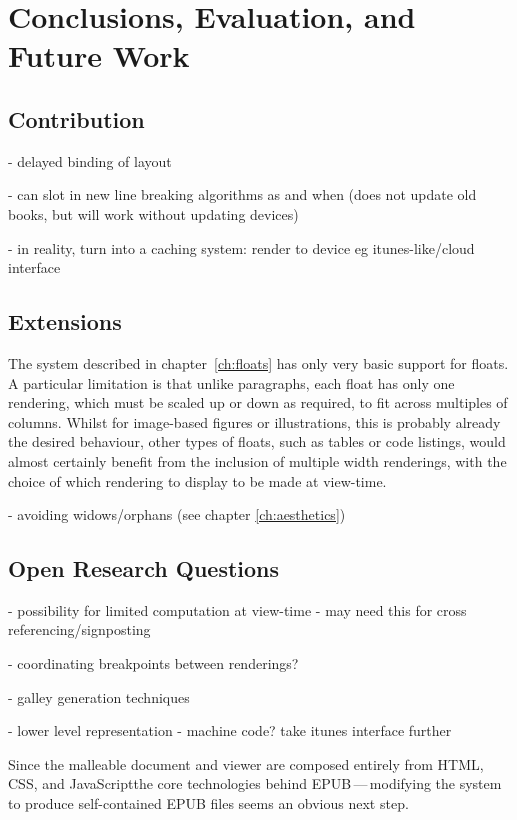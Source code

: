 \chapter{Conclusions, Evaluation, and Future Work}\label{ch:conclusions}

\section{Contribution}

- delayed binding of layout

- can slot in new line breaking algorithms as and when (does not update old books, but will work without updating devices)

- in reality, turn into a caching system: render to device eg itunes-like/cloud interface


\section{Extensions}
The system described in chapter~\ref{ch:floats} has only very basic support for floats. A particular limitation is that unlike paragraphs, each float has only one rendering, which must be scaled up or down as required, to fit across multiples of columns. Whilst for image-based figures or illustrations, this is probably already the desired behaviour, other types of floats, such as tables or code listings, would almost certainly benefit from the inclusion of multiple width renderings, with the choice of which rendering to display to be made at view-time. %

- avoiding widows/orphans (see chapter \ref{ch:aesthetics})



\section{Open Research Questions}

- possibility for limited computation at view-time - may need this for cross referencing/signposting \cite{Thimbleby2011}

- coordinating breakpoints between renderings?

- galley generation techniques

- lower level representation \cite{Bagley2010} - machine code? take itunes interface further


Since the malleable document and viewer are composed entirely from HTML, CSS, and JavaScript\ed the core technologies behind EPUB\,---\,modifying the system to produce self-contained EPUB files seems an obvious next step.

